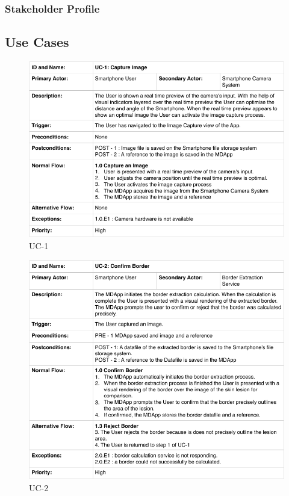     \subsubsection{Stakeholder Profile}




    \subsection{Use Cases}

        \begin{figure}[H]
            \centering
            \includegraphics[width=\textwidth]{assets/requirements/uc/usecase_01.pdf}
            \caption{UC-1}
            \label{fig:uc-1}
        \end{figure}
        \begin{figure}[H]
            \centering
            \includegraphics[width=\textwidth]{assets/requirements/uc/usecase_02.pdf}
            \caption{UC-2}
            \label{fig:uc-2}
        \end{figure}
